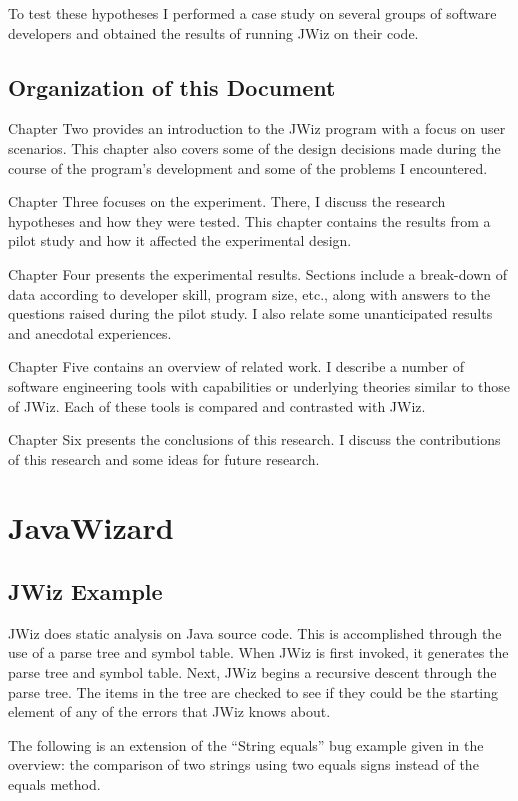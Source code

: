 To test these hypotheses I performed a case study on several groups of
software developers and obtained the results of running JWiz on their code.

\section{Organization of this Document}
Chapter Two provides an introduction to the JWiz program
with a focus on user scenarios.  This chapter also covers some of the
design decisions made during the course of the program's development and
some of the problems I encountered.

Chapter Three focuses on the experiment. There, I discuss the research
hypotheses and how they were tested.  This chapter contains the results
from a pilot study and how it affected the experimental design. 

Chapter Four presents the experimental results. Sections include a
break-down of data according to developer skill, program size, etc., along
with answers to the questions raised during the pilot study.  I also relate
some unanticipated results and anecdotal experiences.

Chapter Five contains an overview of related work.  I describe a number of software
engineering tools with capabilities or underlying theories similar to
those of JWiz.  Each of these tools is compared and contrasted with JWiz.

Chapter Six presents the conclusions of this research. I discuss the
contributions of this research and some ideas for future research.

\chapter{JavaWizard}

\section{JWiz Example} 

JWiz does static analysis on Java source code.  This is accomplished
through the use of a parse tree and symbol table.  When JWiz is first
invoked, it generates the parse tree and symbol table.  Next, JWiz
begins a recursive descent through the parse tree.  The items in the tree
are checked to see if they could be the starting element of any of the
errors that JWiz knows about.

The following is an extension of the ``String equals'' bug example given in
the overview: the comparison of two strings using two equals signs instead
of the equals method.


